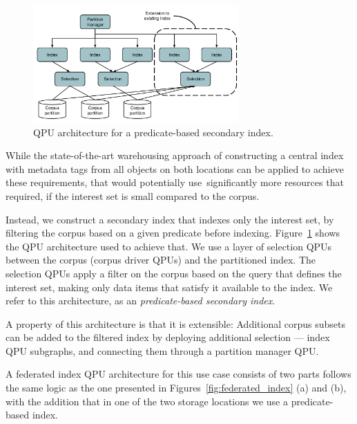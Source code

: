 \begin{figure}
  \centering
    \includegraphics[width=0.7\textwidth]{./figures/case_studies/predicate_based_index.pdf}
  \caption{QPU architecture for a predicate-based secondary index.}
  \label{fig:predicate_based_index}
\end{figure}

While the state-of-the-art warehousing approach of constructing a central index with metadata tags from all objects
on both locations can be applied to achieve these requirements,
that would potentially use significantly more resources that required,
if the interest set is small compared to the corpus.

Instead, we construct a secondary index that indexes only the interest set,
by filtering the corpus based on a given predicate before indexing.
Figure~\ref{fig:predicate_based_index} shows the QPU architecture used to achieve that.
We use a layer of selection QPUs between the corpus (corpus driver QPUs) and the partitioned index.
The selection QPUs apply a filter on the corpus based on the query that defines the interest set,
making only data items that satisfy it available to the index.
We refer to this architecture, as an \textit{predicate-based secondary index}.

A property of this architecture is that it is extensible:
Additional corpus subsets can be added to the filtered index by deploying additional selection --- index QPU subgraphs,
and connecting them through a partition manager QPU.

A federated index QPU architecture for this use case consists of two parts
follows the same logic as the one presented in Figures~\ref{fig:federated_index} (a) and (b),
with the addition that in one of the two storage locations we use a predicate-based index.


